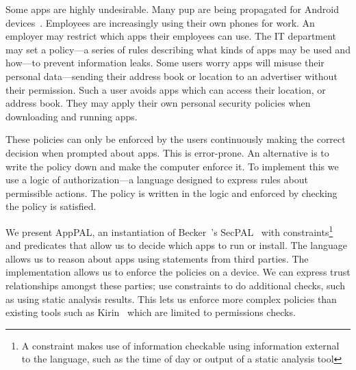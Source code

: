 \documentclass[]{llncs}
\begin{document}
Some apps are highly undesirable.
Many \ac{pup} are being propagated for Android devices~\cite{Truong:2014bi,Svajcer:2013tp}.
Employees are increasingly using their own phones for work.
An employer may restrict which apps their employees can use.
The IT department may set a policy---a series of rules describing what kinds of apps may be used and how---to prevent information leaks.
Some users worry apps will misuse their personal data---sending their address book or location to an advertiser without their permission.
Such a user avoids apps which can access their location, or address book.
They may apply their own personal security policies when downloading and running apps.

These policies can only be enforced by the users continuously making the correct decision when prompted about apps.
This is error-prone.
An alternative is to write the policy down and make the computer enforce it.
To implement this we use a logic of authorization---a language designed to express rules about permissible actions.
The policy is written in the logic and enforced by checking the policy is satisfied.

We present AppPAL, an instantiation of Becker~\etal's SecPAL~\cite{Becker:2006vh} with constraints\footnote{A constraint makes use of information checkable using information external to the language, such as the time of day or output of a static analysis tool} and predicates that allow us to decide which apps to run or install.
The language allows us to reason about apps using statements from third parties.
The implementation allows us to enforce the policies on a device.
We can express trust relationships amongst these parties; use constraints to do additional checks, such as using static analysis results.
This lets us enforce more complex policies than existing tools such as Kirin~\cite{Enck:2009ko} which are limited to permissions checks.
\end{document}

